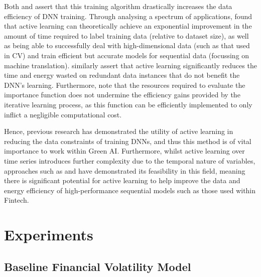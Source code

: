 \documentclass[a4paper, 11pt]{report}
\begin{document}
    Both \citet{ren-2021} and \citet{xu-2021} assert that this training algorithm drastically increases the data efficiency of DNN training. Through analysing a spectrum of applications, \citet{ren-2021} found that active learning can theoretically achieve an exponential improvement in the amount of time required to label training data (relative to dataset size), as well as being able to successfully deal with high-dimensional data (such as that used in CV) and train efficient but accurate models for sequential data (focussing on machine translation). \citet{xu-2021} similarly assert that active learning significantly reduces the time and energy wasted on redundant data instances that do not benefit the DNN's learning. Furthermore, \citet{ren-2021} note that the resources required to evaluate the importance function does not undermine the efficiency gains provided by the iterative learning process, as this function can be efficiently implemented to only inflict a negligible computational cost. 

    Hence, previous research has demonstrated the utility of active learning in reducing the data constraints of training DNNs, and thus this method is of vital importance to work within Green AI. Furthermore, whilst active learning over time series introduces further complexity due to the temporal nature of variables, approaches such as \citet{peng-2017} and \citet{zimmer-2018} have demonstrated its feasibility in this field, meaning there is significant potential for active learning to help improve the data and energy efficiency of high-performance sequential models such as those used within Fintech.


    \newpage
    \chapter{Experiments}
    \label{chapter: experiments}

    \section{Baseline Financial Volatility Model}
    \label{section: baseline}
\end{document}

